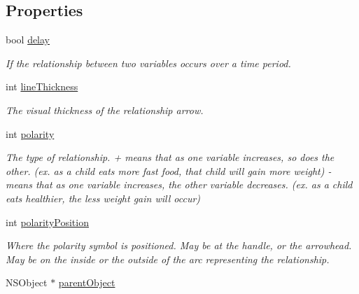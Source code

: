 \subsection*{Properties}
\begin{DoxyCompactItemize}
\item 
\hypertarget{interface_relationship_acde7c910d793a8d8913d949834c8c621}{bool \hyperlink{interface_relationship_acde7c910d793a8d8913d949834c8c621}{delay}}\label{interface_relationship_acde7c910d793a8d8913d949834c8c621}

\begin{DoxyCompactList}\small\item\em If the relationship between two variables occurs over a time period. \end{DoxyCompactList}\item 
\hypertarget{interface_relationship_ac2b0565fb95c9d4080f601e503d752e4}{int \hyperlink{interface_relationship_ac2b0565fb95c9d4080f601e503d752e4}{line\-Thickness}}\label{interface_relationship_ac2b0565fb95c9d4080f601e503d752e4}

\begin{DoxyCompactList}\small\item\em The visual thickness of the relationship arrow. \end{DoxyCompactList}\item 
\hypertarget{interface_relationship_aeffac59edf881b639bb5e7c7137a7312}{int \hyperlink{interface_relationship_aeffac59edf881b639bb5e7c7137a7312}{polarity}}\label{interface_relationship_aeffac59edf881b639bb5e7c7137a7312}

\begin{DoxyCompactList}\small\item\em The type of relationship. + means that as one variable increases, so does the other. (ex. as a child eats more fast food, that child will gain more weight) -\/ means that as one variable increases, the other variable decreases. (ex. as a child eats healthier, the less weight gain will occur) \end{DoxyCompactList}\item 
\hypertarget{interface_relationship_a916d37e666ea886144371ff8f37bdabe}{int \hyperlink{interface_relationship_a916d37e666ea886144371ff8f37bdabe}{polarity\-Position}}\label{interface_relationship_a916d37e666ea886144371ff8f37bdabe}

\begin{DoxyCompactList}\small\item\em Where the polarity symbol is positioned. May be at the handle, or the arrowhead. May be on the inside or the outside of the arc representing the relationship. \end{DoxyCompactList}\item 
\hypertarget{interface_relationship_a886e4aed7b44b7f924aa7a708507761a}{N\-S\-Object $\ast$ \hyperlink{interface_relationship_a886e4aed7b44b7f924aa7a708507761a}{parent\-Object}}\label{interface_relationship_a886e4aed7b44b7f924aa7a708507761a}


\end{DoxyCompactItemize}
